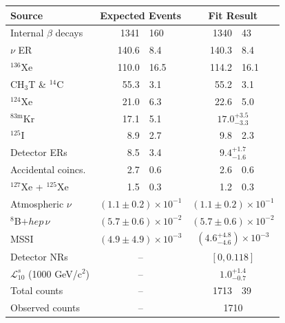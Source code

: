 \begin{table}[th]
    \begin{tabular}{l
                r@{$\,\pm\,$}l
                r@{$\,\pm\,$}l}
     \hline 
     \hline 
    Source & \multicolumn{2}{c}{Expected Events} & \multicolumn{2}{c}{Fit Result} \\\hline 
    Internal $\beta$ decays         & 1341   & 160           & 1340   & 43 \\
    $\nu$ ER                        & 140.6  & 8.4           & 140.3  & 8.4 \\
    $^{136}$Xe                      & 110.0  & 16.5          & 114.2  & 16.1 \\
    CH$_3$T \& $^{14}$C             & 55.3   & 3.1           & 55.2   & 3.1 \\
    $^{124}$Xe                      & 21.0   & 6.3           & 22.6   & 5.0 \\
    $^{83\mathrm{m}}$Kr             & 17.1   & 5.1           & \multicolumn{2}{c}{$17.0^{+3.5}_{-3.3}$} \\
    $^{125}$I                       & 8.9    & 2.7           & 9.8   & 2.3 \\
    Detector ERs                    & 8.5    & 3.4           & \multicolumn{2}{c}{$9.4^{+1.7}_{-1.6}$} \\
    Accidental coincs.              & 2.7    & 0.6           & 2.6    & 0.6 \\
    $^{127}$Xe + $^{125}$Xe         & 1.5    & 0.3           & 1.2    & 0.3 \\
    Atmospheric $\nu$               & \multicolumn{2}{c}{$(1.1 \pm 0.2) \times 10^{-1}$} & \multicolumn{2}{c}{$(1.1 \pm 0.2) \times 10^{-1}$} \\
    $^{8}$B$+hep\,\nu$              & \multicolumn{2}{c}{$(5.7 \pm 0.6) \times 10^{-2}$} & \multicolumn{2}{c}{$(5.7 \pm 0.6) \times 10^{-2}$} \\
    MSSI                            & \multicolumn{2}{c}{$(4.9 \pm 4.9) \times 10^{-3}$} & \multicolumn{2}{c}{$(4.6^{+4.8}_{-4.6}) \times 10^{-3}$}  \\
    Detector NRs                    & \multicolumn{2}{c}{--} & \multicolumn{2}{c}{$[0, 0.118]$} \\%
    $\mathcal{L}_{10}^s$ (1000 GeV/c$^2$)              & \multicolumn{2}{c}{--} & \multicolumn{2}{c}{$1.0^{+1.4}_{-0.7}$} \\
    \hline
    Total counts                    & \multicolumn{2}{c}{--} & 1713 & 39 \\
    \hline
    Observed counts                 & \multicolumn{2}{c}{--} & \multicolumn{2}{c}{1710}$\,\,\,\,\,\,\,\,\,\,\,\,$ \\
    \hline \hline
    \end{tabular}
    \label{tab:backgrounds} 
\end{table}

